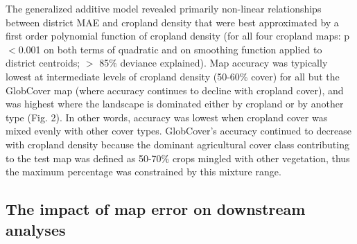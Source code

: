 \documentclass[a4paper]{article}
\begin{document}
The generalized additive model revealed primarily non-linear relationships between district MAE and cropland density that were best approximated by a first order polynomial function of cropland density (for all four cropland maps: p$<$0.001 on both terms of quadratic and on smoothing function applied to district centroids; $>$ 85\% deviance explained). Map accuracy was typically lowest at intermediate levels of cropland density (50-60\% cover) for all but the GlobCover map (where accuracy continues to decline with cropland cover), and was highest where the landscape is dominated either by cropland or by another type (Fig. 2). In other words, accuracy was lowest when cropland cover was mixed evenly with other cover types. GlobCover's accuracy continued to decrease with cropland density because the dominant agricultural cover class contributing to the test map was defined as 50-70\% crops mingled with other vegetation, thus the maximum percentage was constrained by this mixture range.  



\vspace{-0.3 cm}
\subsection*{The impact of map error on downstream analyses}
\vspace{-0.2 cm}
\end{document}
